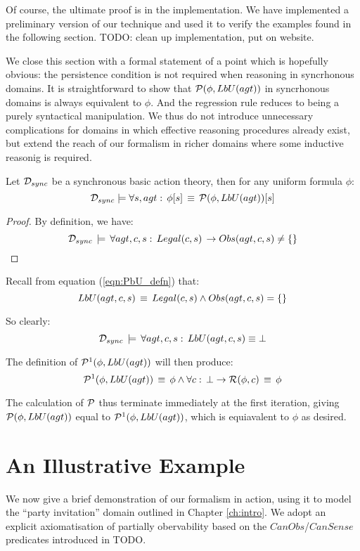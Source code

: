 Of course, the ultimate proof is in the implementation. We have implemented
a preliminary version of our technique and used it to verify the examples
found in the following section. TODO: clean up implementation, put
on website.

We close this section with a formal statement of a point which is
hopefully obvious: the persistence condition is not required when
reasoning in syncrhonous domains. It is straightforward to show that
$\mathcal{P}(\phi,LbU(agt))$ in syncrhonous domains is always equivalent
to $\phi$. And the regression rule reduces to being a purely syntactical
manipulation. We thus do not introduce unnecessary complications for
domains in which effective reasoning procedures already exist, but
extend the reach of our formalism in richer domains where some inductive
reasonig is required.

\begin{thm}
Let $\mathcal{D}_{sync}$ be a synchronous basic action theory, then for any
uniform formula $\phi$:\[
\mathcal{D}_{sync}\models\forall s,agt:\,\phi[s]\,\equiv\,\mathcal{P}(\phi,LbU(agt))[s]\]

\end{thm}
\begin{proof}
By definition, we have:\[
\mathcal{D}_{sync}\,\models\,\forall agt,c,s:\, Legal(c,s)\,\rightarrow Obs(agt,c,s)\neq\{\}\]

\end{proof}
Recall from equation (\ref{eqn:PbU_defn}) that:\[
LbU(agt,c,s)\,\equiv\, Legal(c,s)\wedge Obs(agt,c,s)=\{\}\]


So clearly:\[
\mathcal{D}_{sync}\,\models\,\forall agt,c,s:\,LbU(agt,c,s)\equiv\bot\]


The definition of $\mathcal{P}^{1}(\phi,LbU(agt))$ will then produce:\[
\mathcal{P}^{1}(\phi,LbU(agt))\,\equiv\,\phi\wedge\forall c:\,\bot\rightarrow\mathcal{R}(\phi,c)\,\equiv\,\phi\]


The calculation of $\mathcal{P}$ thus terminate immediately at the first
iteration, giving $\mathcal{P}(\phi,LbU(agt))$ equal to $\mathcal{P}^{1}(\phi,LbU(agt))$,
which is equiavalent to $\phi$ as desired.


\section{An Illustrative Example\label{sec:Knowledge:Example}}

We now give a brief demonstration of our formalism in action, using
it to model the {}``party invitation'' domain outlined in Chapter
\ref{ch:intro}. We adopt an explicit axiomatisation of partially
obervability based on the $CanObs$/$CanSense$ predicates introduced
in TODO.

